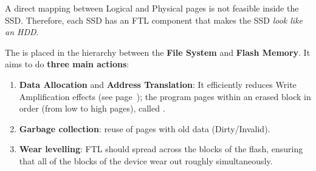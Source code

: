 \noindent
A direct mapping between Logical and Physical pages is not feasible inside the SSD. Therefore, each SSD has an FTL component that makes the SSD \emph{look like an HDD}.

\highspace
The  is placed in the hierarchy between the \textbf{File System} and \textbf{Flash Memory}. It aims to do \textbf{three main actions}:
\begin{enumerate}
    \item \textbf{Data Allocation} and \textbf{Address Translation}: It efficiently reduces Write Amplification effects (see page~\pageref{Write amplification (WA)}); the program pages within an erased block in order (from low to high pages), called .

    \item \textbf{Garbage collection}: reuse of pages with old data (Dirty/Invalid).

    \item \textbf{Wear levelling}: FTL should spread across the blocks of the flash, ensuring that all of the blocks of the device wear out roughly simultaneously.
\end{enumerate}

